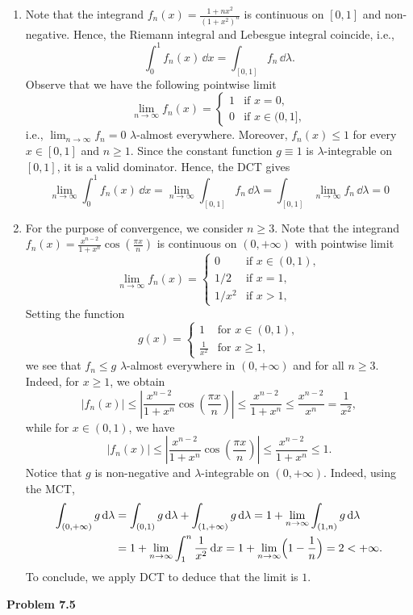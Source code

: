 \begin{enumerate}[label={(\alph*)}]
	\item Note that the integrand $f_n(x)=\frac{1+n x^2}{(1+x^2)^n}$ is continuous on $[0, 1]$ and non-negative. Hence, the Riemann integral and Lebesgue integral coincide, i.e.,
	\[
		\int_0^1 f_n(x)\,\dd x = \int_{[0,1]} f_n\,\dd\lambda.
	\] 
	Observe that we have the following pointwise limit
	\[
		\lim_{n\to\infty} f_n(x) = \begin{cases}
			1 &\text{if  $x=0$}, \\
			0 &\text{if $x\in (0,1]$},
		\end{cases}
	\]
	i.e., $\lim_{n\to\infty} f_n = 0$ $\lambda$-almost everywhere. Moreover, $f_n(x) \le 1$ for every $x\in[0,1]$ and $n\ge 1$. Since the constant function $g\equiv 1$ is $\lambda$-integrable on $[0,1]$, it is a valid dominator. Hence, the DCT gives
	\[
		\lim_{n\to\infty} \int_0^1 f_n(x)\,\dd x = \lim_{n\to\infty} \int_{[0,1]} f_n\,\dd \lambda = \int_{[0,1]} \lim_{n\to\infty} f_n\,\dd\lambda = 0
	\]
	
	\item For the purpose of convergence, we consider $n\ge 3$. Note that the integrand $f_n(x)=\frac{x^{n-2}}{1+x^n}\cos\left(\frac{\pi x}{n}\right)$ is continuous on $(0, +\infty)$ with pointwise limit
	\[
		\lim_{n\to\infty} f_n(x) = \begin{cases}
			0 & \text{if $x\in(0,1)$}, \\
			1/2 & \text{if $x=1$}, \\
			1/x^2 & \text{if $x>1$},
		\end{cases}
	\]
	Setting the function
	\[
		g(x) = \begin{cases}
			1 &\text{for $x\in(0,1)$},\\
			\frac{1}{x^2} &\text{for $x\ge 1$},
		\end{cases}
	\]
	we see that $f_n\le g$ $\lambda$-almost everywhere in $(0,+\infty)$ and for all $n\ge 3$. Indeed, for $x\ge 1$, we obtain
	\[
		|f_n(x)| \le \left| \frac{x^{n-2}}{1+x^n}\cos\left(\frac{\pi x}{n}\right)\right| \le \frac{x^{n-2}}{1+x^n} \le \frac{x^{n-2}}{x^n} =\frac{1}{x^2},
	\]
	while for $x\in(0,1)$, we have
	\[
		|f_n(x)| \le \left| \frac{x^{n-2}}{1+x^n}\cos\left(\frac{\pi x}{n}\right)\right| \le \frac{x^{n-2}}{1+x^n} \le 1.
	\]
	Notice that $g$ is non-negative and $\lambda$-integrable on $(0,+\infty)$. Indeed, using the MCT,
	\begin{align*}
		\int_{(0,+\infty)} g\,\mathrm{d}\lambda &= \int_{(0,1)} g\,\mathrm{d}\lambda + \int_{(1,+\infty)} g\,\mathrm{d}\lambda = 1 + \lim_{n\to\infty} \int_{(1,n)} g\,\mathrm{d}\lambda \\
		&= 1 + \lim_{n\to\infty} \int_1^n \frac{1}{x^2}\,\mathrm{d} x = 1 + \lim_{n\to\infty} \Bigl(1-\frac{1}{n} \Bigr) = 2 < +\infty.
	\end{align*}
	To conclude, we apply DCT to deduce that the limit is $1$.
	
\end{enumerate}

\bigskip

\textbf{Problem 7.5}

\bigskip